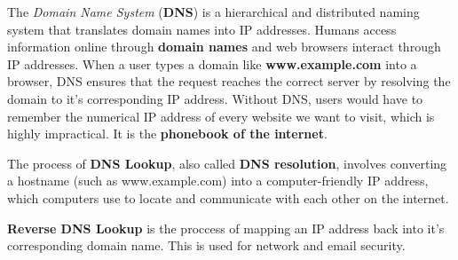 The \textit{Domain Name System} (\textbf{DNS}) is a hierarchical and distributed naming system that translates domain names into IP addresses. Humans access information online through \textbf{domain names} and web browsers interact through IP addresses. When a user types a domain like \textbf{www.example.com} into a browser, DNS ensures that the request reaches the correct server by resolving the domain to it's corresponding IP address. Without DNS, users would have to remember the numerical IP address of every website we want to visit, which is highly impractical. It is the \textbf{phonebook of the internet}.

The process of \textbf{DNS Lookup}, also called \textbf{DNS resolution}, involves converting a hostname (such as www.example.com) into a computer-friendly IP address, which computers use to locate and communicate with each other on the internet.

\textbf{Reverse DNS Lookup} is the proccess of mapping an IP address back into it's corresponding domain name. This is used for network and email security.
